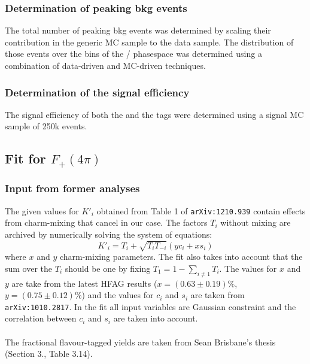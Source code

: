 \subsubsection{Determination of peaking bkg events}
The total number of peaking bkg events was determined by scaling their contribution in the generic MC sample to the data sample. The distribution of those events over the bins of the \KsPiPi / \KlPiPi phasespace was determined using a combination of data-driven and MC-driven techniques.\\
  
\subsubsection{Determination of the signal efficiency}
The signal efficiency of both the \KsPiPi and the \KlPiPi tags were determined using a signal MC sample of 250k events.\\


\subsection{Fit for $F_+(4\pi)$}
\subsubsection{Input from former analyses}
The given values for $K'_i$ obtained from Table 1 of \texttt{arXiv:1210.939} contain effects from charm-mixing that cancel in our case. The factors $T_i$ without mixing are archived by numerically solving the system of equations:
\begin{equation}
K'_i = T_i + \sqrt{T_i T_{-i}} (y c_i + x s_i)
\end{equation}
where $x$ and $y$ charm-mixing parameters. The fit also takes into account that the sum over the $T_i$ should be one by fixing  $T_1 = 1 - \sum_{i \neq 1} T_i$. The values for $x$ and $y$ are take from the latest HFAG results ($x = (0.63 \pm 0.19)\%$, $y = (0.75 \pm 0.12)\% $) and the values for $c_i$ and $s_i$ are taken from \texttt{arXiv:1010.2817}. In the fit all input variables are Gaussian constraint and the correlation between $c_i$ and $s_i$ are taken into account.\\
\\
The fractional flavour-tagged \KlPiPi yields are taken from Sean Brisbane's thesis (Section 3., Table 3.14).\\

